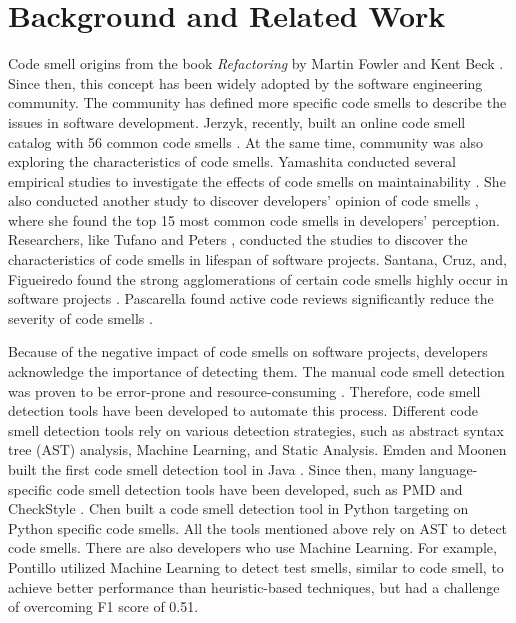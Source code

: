 \section{Background and Related Work}
\label{sec:background}

Code smell origins from the book \textit{Refactoring} by Martin Fowler and Kent Beck \cite{Fowler_Beck}.
Since then, this concept has been widely adopted by the software engineering community. The community has
defined more specific code smells \cite{Pysmell} \cite{CleanCode} \cite{SQLAntipatterns} 
\cite{RefactoringWorkbook} to describe the issues in software development. Jerzyk, recently, built
an online code smell catalog with 56 common code smells \cite{Jerzyk2023}.
At the same time, community was also exploring the characteristics of code smells. Yamashita 
conducted several empirical studies to investigate the effects of code smells on maintainability \cite{6405287} \cite{6392174}. She
also conducted another study to discover developers' opinion of code smells \cite{developersCare}, where 
she found the top 15 most common code smells in developers' perception. Researchers, like Tufano \cite{whenandwhy} and Peters \cite{lifespan}, conducted the studies to
discover the characteristics of code smells in lifespan of software projects. Santana, Cruz, and, Figueiredo found the
strong agglomerations of certain code smells highly occur in software projects \cite{Santana}. Pascarella found active code reviews significantly reduce the severity of code smells \cite{Pascarella}.


Because of the negative impact of code smells on software projects, developers acknowledge the importance of detecting them. The manual code smell detection was proven to be
error-prone and resource-consuming \cite{DetectingDefectsInObject-orientedDesigns}. Therefore, code smell detection tools have been developed to automate this process.
Different code smell detection tools rely on various detection strategies, such as abstract syntax tree (AST) analysis, Machine Learning, and Static Analysis.
Emden and Moonen built the first code smell detection tool in Java \cite{1173068}. Since then,
many language-specific code smell detection tools have been developed, such as PMD \cite{PMD} and CheckStyle \cite{CheckStyle}.
Chen \cite{Pysmell} built a code smell detection tool in Python targeting on Python specific code smells.
All the tools mentioned above rely on AST to detect code smells. There are also developers who use Machine Learning. 
For example, Pontillo utilized Machine Learning to detect test smells, similar to code smell, to achieve better performance than heuristic-based techniques, but had a challenge of overcoming F1 score of 0.51.

